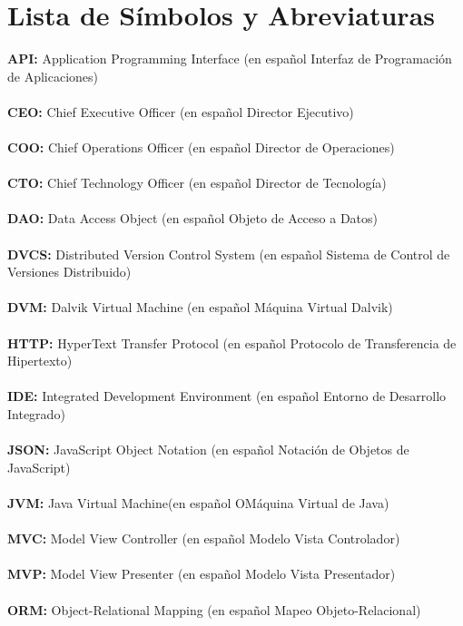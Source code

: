 \chapter*{Lista de Símbolos y Abreviaturas}%

\vspace{5 mm}
\noindent
\textbf{API:} Application Programming Interface (en español Interfaz de Programación de Aplicaciones)\\ \\
\textbf{CEO:} Chief Executive Officer (en español Director Ejecutivo)\\ \\
\textbf{COO:} Chief Operations Officer (en español Director de Operaciones)\\ \\
\textbf{CTO:} Chief Technology Officer (en español Director de Tecnología)\\ \\
\textbf{DAO:} Data Access Object (en español Objeto de Acceso a Datos)\\ \\
\textbf{DVCS:} Distributed Version Control System (en español Sistema de Control de Versiones Distribuido)\\ \\
\textbf{DVM:} Dalvik Virtual Machine (en español Máquina Virtual Dalvik)\\ \\
\textbf{HTTP:} HyperText Transfer Protocol (en español Protocolo de Transferencia de Hipertexto)\\ \\
\textbf{IDE:} Integrated Development Environment (en español Entorno de Desarrollo Integrado)\\ \\
\textbf{JSON:} JavaScript Object Notation (en español Notación de Objetos de JavaScript)\\ \\
\textbf{JVM:} Java Virtual Machine(en español OMáquina Virtual de Java)\\ \\
\textbf{MVC:} Model View Controller (en español Modelo Vista Controlador)\\ \\
\textbf{MVP:} Model View Presenter (en español Modelo Vista Presentador)\\ \\
\textbf{ORM:} Object-Relational Mapping (en español Mapeo Objeto-Relacional)\\ \\
